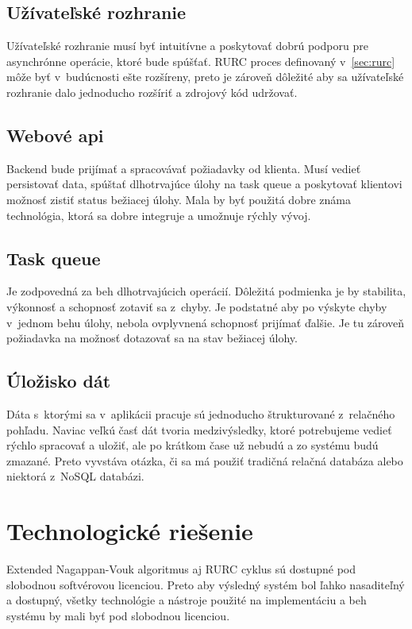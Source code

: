 \subsection{Užívateľské rozhranie}
Užívateľské rozhranie musí byť intuitívne a poskytovať dobrú podporu pre asynchrónne operácie, ktoré bude spúšťať. RURC proces definovaný v~\ref{sec:rurc} môže byť v~budúcnosti ešte rozšíreny, preto je zároveň dôležité aby sa užívateľské rozhranie dalo jednoducho rozšíriť a zdrojový kód udržovať.

\subsection{Webové api}
Backend bude prijímať a spracovávať požiadavky od klienta. Musí vedieť persistovať data, spúštať dlhotrvajúce úlohy na task queue a poskytovať klientovi možnosť zistiť status bežiacej úlohy. Mala by byť použitá dobre známa technológia, ktorá sa dobre integruje a umožnuje rýchly vývoj.

\subsection{Task queue}
Je zodpovedná za beh dlhotrvajúcich operácií. Dôležitá podmienka je by stabilita, výkonnosť a schopnosť zotaviť sa z~chyby. Je podstatné aby po výskyte chyby v~jednom behu úlohy, nebola ovplyvnená schopnosť prijímať ďalšie. Je tu zároveň požiadavka na možnosť dotazovať sa na stav bežiacej úlohy.

\subsection{Úložisko dát}
Dáta s~ktorými sa v~aplikácii pracuje sú jednoducho štrukturované z~relačného pohľadu. Naviac veľkú časť dát tvoria medzivýsledky, ktoré potrebujeme vedieť rýchlo spracovať a uložiť, ale po krátkom čase už nebudú a zo systému budú zmazané. Preto vyvstáva otázka, či sa má použiť tradičná relačná databáza alebo niektorá z~NoSQL databázi. 

\section{Technologické riešenie}

Extended Nagappan-Vouk algoritmus aj RURC cyklus sú dostupné pod slobodnou softvérovou licenciou. Preto aby výsledný systém bol ľahko nasaditeľný a dostupný, všetky technológie a nástroje použité na implementáciu a beh systému by mali byť pod slobodnou licenciou.

